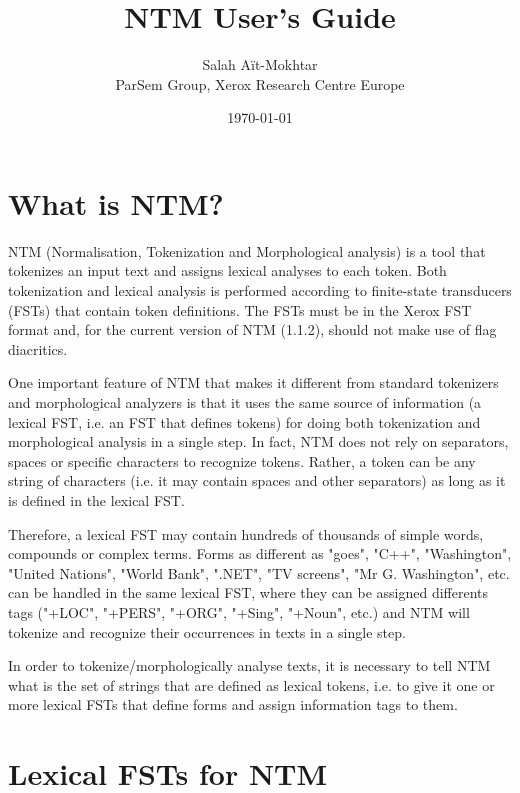 \documentclass{article}
\begin{document}
\title{NTM User's Guide}


\author{Salah A\"{i}t-Mokhtar\\ ParSem Group, Xerox Research Centre Europe}
\date{\today}

\maketitle

\section{What is NTM?}

NTM (Normalisation, Tokenization and Morphological analysis) is a tool that tokenizes an input text and assigns lexical analyses to each token. Both tokenization and lexical analysis is performed according to finite-state transducers (FSTs) that contain token definitions. The FSTs must be in the Xerox FST format and, for the current version of NTM (1.1.2), should not make use of flag diacritics.


One important feature of NTM that makes it different from standard tokenizers and morphological analyzers is that it uses the same source of information (a lexical FST, i.e. an FST that defines tokens) for doing both tokenization and morphological analysis in a single step. In fact, NTM does not rely on separators, spaces or specific characters to recognize tokens. Rather, a token can be any string of characters (i.e. it may contain spaces and other separators) as long as it is defined in the lexical FST.

Therefore, a lexical FST may contain hundreds of thousands of simple words, compounds or complex terms. Forms as different as "goes", "C++", "Washington", "United Nations", "World Bank", ".NET", "TV screens", "Mr G. Washington", etc. can be handled in the same lexical FST, where they can be assigned differents tags ("+LOC", "+PERS", "+ORG", "+Sing", "+Noun", etc.) and NTM will tokenize and recognize their occurrences in texts in a single step.


In order to tokenize/morphologically analyse texts, it is necessary to tell NTM what is the set of strings that are defined as lexical tokens, i.e. to give it one or more lexical FSTs that define forms and assign information tags to them.

\section{Lexical FSTs for NTM}
\end{document}
